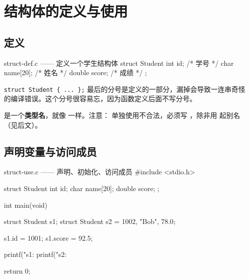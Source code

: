 \section{结构体的定义与使用}

\subsection{定义}

\begin{center}
\end{center}

\begin{codebox}{struct-def.c —— 定义一个学生结构体}
struct Student {
    int id;             /* 学号 */
    char name[20];      /* 姓名 */
    double score;       /* 成绩 */
};
\end{codebox}

\begin{pitfall}[结构体定义末尾的分号不能少]
\texttt{struct Student \{ ... \};} 最后的分号是定义的一部分，漏掉会导致一连串奇怪的编译错误。这个分号很容易忘，因为函数定义后面不写分号。
\end{pitfall}

 是一个\textbf{类型名}，就像  一样。注意： 单独使用不合法，必须写 ，除非用  起别名（见后文）。

\subsection{声明变量与访问成员}

\begin{codebox}{struct-use.c —— 声明、初始化、访问成员}
#include <stdio.h>

struct Student {
    int id;
    char name[20];
    double score;
};

int main(void)
{
    struct Student s1;
    struct Student s2 = {1002, "Bob", 78.0};

    s1.id = 1001;
    s1.score = 92.5;

    printf("s1: %
    printf("s2: %

    return 0;
}
\end{codebox}

